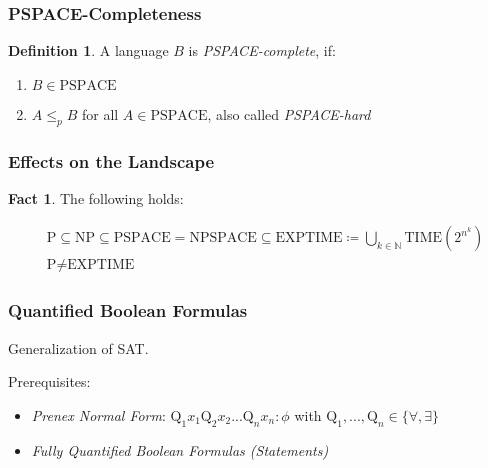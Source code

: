 \documentclass[notheorems]{beamer}
\theoremstyle{definition}
\newtheorem{definition}{Definition}
\newtheorem{fact}{Fact}
\theoremstyle{remark}
\newcommand{\pclass}{\text{P}}
\newcommand{\npclass}{\text{NP}}
\newcommand{\pspaceclass}{\text{PSPACE}}
\newcommand{\npspaceclass}{\text{NPSPACE}}
\newcommand{\exptimeclass}{\text{EXPTIME}}
\begin{document}
\begin{frame}
    \frametitle{PSPACE-Completeness}

    \pause

    \begin{definition} A language \(B\) is \emph{PSPACE-complete}, if:
        \begin{enumerate}
            \item \(B \in \pspaceclass\)
            \item \(A \leq_p B\) for all \(A \in \pspaceclass\), also called \emph{PSPACE-hard}
        \end{enumerate}
    \end{definition}

\end{frame}

\begin{frame}
    \frametitle{Effects on the Landscape}

    \begin{fact} The following holds:
        \pause
        \begin{ceqn}
            \begin{align*}
                &\pclass \subseteq \npclass \subseteq \pspaceclass = \npspaceclass \subseteq \exptimeclass \coloneqq \bigcup_{k \in \mathbb{N}} \text{TIME}\left(2^{n^k}\right)\\
                &\pclass \neq \exptimeclass
            \end{align*}
        \end{ceqn}
    \end{fact}

\end{frame}

\begin{frame}
    \frametitle{Quantified Boolean Formulas}

    \pause

    Generalization of SAT.
    
    Prerequisites:
    \begin{itemize}
        \pause
        \item \emph{Prenex Normal Form}: \(\text{Q}_1x_1\text{Q}_2x_2...\text{Q}_nx_n\colon\phi\) with \(\text{Q}_1,...,\text{Q}_n \in \{\forall,\exists\}\)
        \pause
        \item \emph{Fully Quantified Boolean Formulas (Statements)}
    \end{itemize}

\end{frame}
\end{document}
